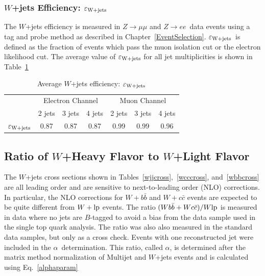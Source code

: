 \subsubsection{$W$+jets Efficiency: $\varepsilon_{\rm{W+jets}}$ }

The $W$+jets efficiency is measured in $Z\rightarrow \mu\mu$ and $Z\rightarrow ee$~data events using a tag and probe method as described in Chapter~\ref{EventSelection}. $\varepsilon_{\rm{W+jets}}$~is defined as the fraction of events which pass the muon isolation cut or the electron likelihood cut. The average value of $\varepsilon_{\rm{W+jets}}$ for all jet multiplicities is shown in Table~\ref{epsilonsig}

\vspace{0.2in}
\begin{table}[!h!tbp]
\begin{center}
\caption{Average $W$+jets efficiency: $\varepsilon_{\rm{W+jets}}$}
\label{epsilonsig}
\begin{tabular}{c|ccc|ccc}
& \multicolumn{3}{c|}{Electron Channel} & \multicolumn{3}{c}{Muon Channel}    \\
                               & 2 jets & 3 jets & 4 jets
                               & 2 jets & 3 jets & 4 jets \\
\hline
$\varepsilon_{\rm{W+jets}}$   &   0.87 &   0.87 &   0.87 &  0.99 &   0.99 &  0.96  \\
\end{tabular}
\vspace{-0.1in}
\end{center}
\end{table}


\subsection{Ratio of $W$+Heavy Flavor to $W$+Light Flavor}

The $W$+jets cross sections shown in Tables~\ref{wjjcross},~\ref{wcccross}, and~\ref{wbbcross} are all leading order and are sensitive to next-to-leading order (NLO) corrections. In particular, the NLO corrections for $W+b\bar{b}$ and $W+c\bar{c}$ events are expected to be quite different from $W+\rm{lp}$ events. The ratio $(Wb\bar{b}+Wc\bar{c})/W\rm{lp}$ is measured in data where no jets are $B$-tagged to avoid a bias from the data sample used in the single top quark analysis. The ratio was also also measured in the standard data samples, but only as a cross check. Events with one reconstructed jet were included in the $\alpha$~determination. This ratio, called $\alpha$, is determined after the matrix method normalization of Multijet and $W$+jets events and is calculated using Eq.~\ref{alphaparam}

